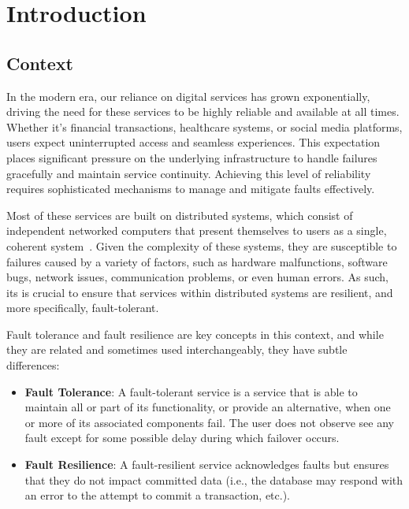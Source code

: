\chapter{Introduction}\label{ch:introduction}


\section{Context}\label{sec:context}

In the modern era, our reliance on digital services has grown exponentially, driving the need for these services to be highly reliable and available at all times. Whether it's financial transactions, healthcare systems, or social media platforms, users expect uninterrupted access and seamless experiences. This expectation places significant pressure on the underlying infrastructure to handle failures gracefully and maintain service continuity. Achieving this level of reliability requires sophisticated mechanisms to manage and mitigate faults effectively.

Most of these services are built on distributed systems,
which consist of independent networked computers that present themselves to users as a single,
coherent system~\cite{fcc-distributed-systems}.
Given the complexity of these systems, they are susceptible to failures caused by a variety of factors, such as hardware malfunctions, software bugs, network issues, communication problems, or even human errors.
As such, its is crucial to ensure that services within distributed systems are resilient, and more specifically, fault-tolerant.

Fault tolerance and fault resilience are key concepts in this context, and while they are related and sometimes used interchangeably, they have subtle differences:

\begin{itemize}
    \item {\textbf{Fault Tolerance}}:
    A fault-tolerant service is a service that is able to maintain all or part of its functionality,
    or provide an alternative, when one or more of its associated components fail.
    The user does not observe see any fault except for some possible delay during which failover occurs.
    \item {\textbf{Fault Resilience}}: A fault-resilient service acknowledges faults but ensures that they do not impact committed data (i.e., the database may respond with an error to the attempt to commit a transaction, etc.).
\end{itemize}

